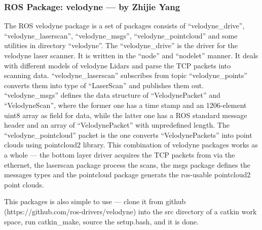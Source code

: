 \documentclass[conference]{IEEEtran}
\begin{document}
\subsubsection{ROS Package: velodyne --- by Zhijie Yang}
The ROS velodyne package is a set of packages consists of ``velodyne\_drive'', ``velodyne\_laserscan'', ``velodyne\_msgs'',  ``velodyne\_pointcloud'' and some utilities in directory ``velodyne''. The ``velodyne\_drive'' is the driver for the velodyne laser scanner. It is written in the ``node'' and ``nodelet'' manner. It deals with different models of velodyne Lidars and parse the TCP packets into scanning data. ``velodyne\_laserscan'' subscribes from topic ``velodyne\_points'' converts them into type of ``LaserScan'' and publishes them out. ``velodyne\_msgs'' defines the data structure of ``VelodynePacket'' and ``VelodyneScan'', where the former one has a time stamp and an 1206-element uint8 array as field for data, while the latter one has a ROS standard message header and an array of ``VelodynePacket'' with unpredefined length. The ``velodyne\_pointcloud'' packet is the one converts ``VelodynePackets'' into point clouds using pointcloud2 library. This combination of velodyne packages works as a whole --- the bottom layer driver acquires the TCP packets from via the ethernet, the laserscan package process the scans, the msgs package defines the messages types and the pointcloud package generats the ros-usable pointcloud2 point clouds. 

This packages is also simple to use --- clone it from github (https://github.com/ros-drivers/velodyne) into the src directory of a catkin work space, run catkin\_make, source the setup.bash, and it is done. 
\end{document}
